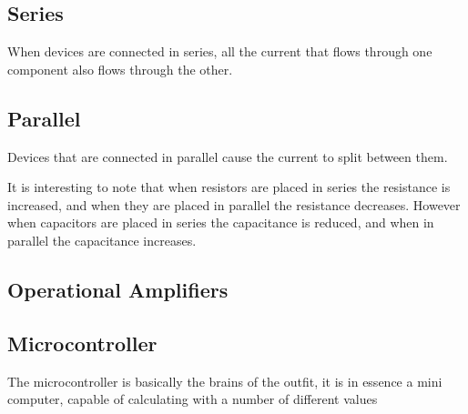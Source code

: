 \subsection{Series}
When devices are connected in series, all the current that flows through one component also flows through the other.

\subsection{Parallel}
Devices that are connected in parallel cause the current to split between them.

It is interesting to note that when resistors are placed in series the resistance is increased, and when they are placed in parallel the resistance decreases.
However when capacitors are placed in series the capacitance is reduced, and when in parallel the capacitance increases.

\subsection{Operational Amplifiers}


% 

\subsection{Microcontroller}

The microcontroller is basically the brains of the outfit, it is in essence a mini computer, capable of calculating with a number of different values

%
